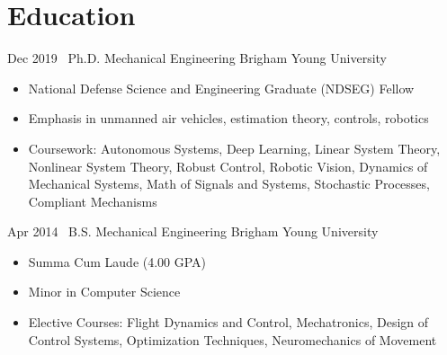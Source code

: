 \section{Education}

\begin{entrylist}
\entry
{Dec 2019}
{\byu~Ph.D. Mechanical Engineering}
{Brigham Young University}
{%
\vspace{-1em}
\begin{itemize}
    \item National Defense Science and Engineering Graduate (NDSEG) Fellow
    \item Emphasis in unmanned air vehicles, estimation theory, controls, robotics
    \item Coursework: Autonomous Systems, Deep Learning, Linear System Theory, Nonlinear System Theory, Robust Control, Robotic Vision, Dynamics of Mechanical Systems, Math of Signals and Systems, Stochastic Processes, Compliant Mechanisms
\end{itemize}
}

\entry
{Apr 2014}
{\byu~B.S. Mechanical Engineering}
{Brigham Young University}
{%
\vspace{-1em}
\begin{itemize}
    \item Summa Cum Laude (4.00 GPA)
    \item Minor in Computer Science
    \item Elective Courses: Flight Dynamics and Control, Mechatronics, Design of Control Systems, Optimization Techniques, Neuromechanics of Movement
\end{itemize}
}
\end{entrylist}